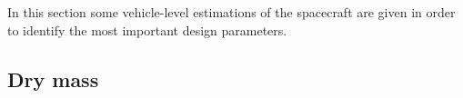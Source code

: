 









In this section some vehicle-level estimations of the spacecraft are
given in order to identify the most important design parameters.

\subsection{Dry mass}
\label{sec:drymass}

